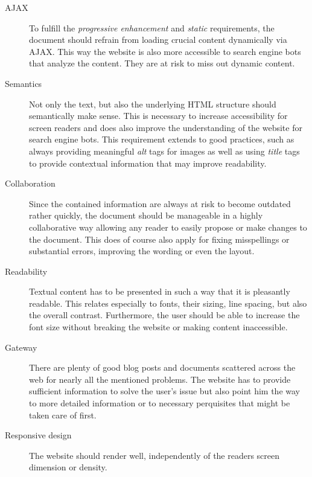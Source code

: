 \begin{description}
	\item[\ac{AJAX}]\hfill

	To fulfill the \textit{progressive enhancement} and \textit{static} requirements, the document should refrain from loading crucial content dynamically via \ac{AJAX}. This way the website is also more accessible to search engine bots that analyze the content. They are at risk to miss out dynamic content.

	\item[Semantics]\hfill

	Not only the text, but also the underlying \ac{HTML} structure should semantically make sense. This is necessary to increase accessibility for screen readers and does also improve the understanding of the website for search engine bots. This requirement extends to good practices, such as always providing meaningful \textit{alt} tags for images as well as using \textit{title} tags to provide contextual information that may improve readability.

	\item[Collaboration]\hfill

	Since the contained information are always at risk to become outdated rather quickly, the document should be manageable in a highly collaborative way allowing any reader to easily propose or make changes to the document. This does of course also apply for fixing misspellings or substantial errors, improving the wording or even the layout.

	\item[Readability]\hfill

	Textual content has to be presented in such a way that it is pleasantly readable. This relates especially to fonts, their sizing, line spacing, but also the overall contrast. Furthermore, the user should be able to increase the font size without breaking the website or making content inaccessible.

	\item[Gateway]\hfill

	There are plenty of good blog posts and documents scattered across the web for nearly all the mentioned problems. The website has to provide sufficient information to solve the user's issue but also point him the way to more detailed information or to necessary perquisites that might be taken care of first.

	\item[Responsive design]\hfill

	The website should render well, independently of the readers screen dimension or density.


\end{description}
